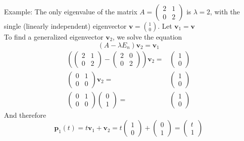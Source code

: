 Example: The only eigenvalue of the matrix $A = \begin{pmatrix} 2 & 1 \\ 0 & 2 \end{pmatrix}$ is $\lambda = 2$, with the single (linearly
independent) eigenvector $\mathbf{v} = \binom{1}{0}$. Let $\mathbf{v}_1 = \mathbf{v}$\\
To find a generalized eigenvector $\mathbf{v}_2$, we solve the equation
\begin{equation}
  (A - \lambda E_n)\mathbf{v}_2 = \mathbf{v}_1
\end{equation}
\begin{equation}
  \begin{split}
    \left(\begin{pmatrix} 2 & 1 \\ 0 & 2 \end{pmatrix} -
    \begin{pmatrix} 2 & 0 \\ 0 & 2 \end{pmatrix} \right) \mathbf{v}_2 =&
    \begin{pmatrix} 1 \\ 0 \end{pmatrix}\\
    \begin{pmatrix} 0 & 1 \\ 0 & 0 \end{pmatrix} \mathbf{v}_2 =&
    \begin{pmatrix} 1 \\ 0 \end{pmatrix}\\
    \begin{pmatrix} 0 & 1 \\ 0 & 0 \end{pmatrix} \begin{pmatrix} 0 \\ 1 \end{pmatrix} =&
    \begin{pmatrix} 1 \\ 0 \end{pmatrix}
  \end{split}
\end{equation}
And therefore
\begin{equation}
  \mathbf{p}_1(t) = t\mathbf{v}_1 + \mathbf{v}_2 = t
  \begin{pmatrix} 1 \\ 0\end{pmatrix} +
  \begin{pmatrix} 0 \\ 1  \end{pmatrix} =
  \begin{pmatrix} t \\ 1 \end{pmatrix}
\end{equation}

